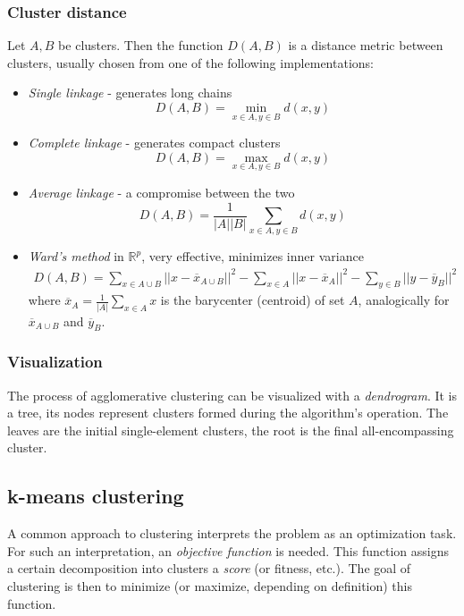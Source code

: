 \documentclass[a4paper]{article}
\begin{document}
	\subsubsection{Cluster distance}
	Let $A, B$ be clusters. Then the function $D(A, B)$ is a distance metric between clusters,
	usually chosen from one of the following implementations:
	\begin{itemize}
		\item \textit{Single linkage} - generates long chains
			$$D(A, B) = \min_{x \in A, y \in B} d(x, y)$$
		\item \textit{Complete linkage} - generates compact clusters
			$$D(A, B) = \max_{x \in A, y \in B} d(x, y)$$
		\item \textit{Average linkage} - a compromise between the two
			$$D(A, B) = \frac{1}{|A||B|} \sum_{x \in A, y \in B} d(x, y)$$
		\item \textit{Ward's method} in $\mathbb{R}^p$, very effective, minimizes inner variance
			\begin{align*}
				D(A, B) = \sum_{x \in A \cup B} ||x - \overline{x}_{A \cup B}||^2
						- \sum_{x \in A} ||x - \overline{x}_A||^2
						- \sum_{y \in B} ||y - \overline{y}_B||^2
			\end{align*}
			where $\overline{x}_A = \frac{1}{|A|} \sum_{x \in A} x$ is the barycenter (centroid)
			of set $A$, analogically for $\overline{x}_{A \cup B}$ and $\overline{y}_B$.
	\end{itemize}

	\subsubsection{Visualization}
	The process of agglomerative clustering can be visualized with a \textit{dendrogram}.
	It is a tree, its nodes represent clusters formed during the algorithm's operation.
	The leaves are the initial single-element clusters, the root is the final all-encompassing
	cluster.

	\subsection{k-means clustering}
	A common approach to clustering interprets the problem as an optimization task.
	For such an interpretation, an \textit{objective function} is needed. This function
	assigns a certain decomposition into clusters a \textit{score} (or fitness, etc.).
	The goal of clustering is then to minimize (or maximize, depending on definition)
	this function.
\end{document}
